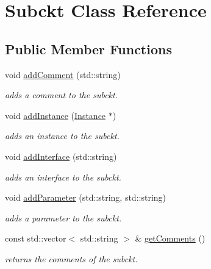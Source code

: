 \hypertarget{class_s_p_i_c_e_1_1_subckt}{}\section{Subckt Class Reference}
\label{class_s_p_i_c_e_1_1_subckt}
\subsection*{Public Member Functions}
\begin{DoxyCompactItemize}
\item 
void \mbox{\hyperlink{class_s_p_i_c_e_1_1_subckt_a6c590c1d92248d6e5f95ea6c470fbb5a}{add\+Comment}} (std\+::string)
\begin{DoxyCompactList}\small\item\em adds a comment to the subckt. \end{DoxyCompactList}\item 
void \mbox{\hyperlink{class_s_p_i_c_e_1_1_subckt_a7bb4a4532643568ab1ac2c229185a88e}{add\+Instance}} (\mbox{\hyperlink{class_s_p_i_c_e_1_1_instance}{Instance}} $\ast$)
\begin{DoxyCompactList}\small\item\em adds an instance to the subckt. \end{DoxyCompactList}\item 
void \mbox{\hyperlink{class_s_p_i_c_e_1_1_subckt_ac162264683fa3d9b3384d3e8cc291fa2}{add\+Interface}} (std\+::string)
\begin{DoxyCompactList}\small\item\em adds an interface to the subckt. \end{DoxyCompactList}\item 
void \mbox{\hyperlink{class_s_p_i_c_e_1_1_subckt_ab3ab147a16bc490ce96db905a4ca271c}{add\+Parameter}} (std\+::string, std\+::string)
\begin{DoxyCompactList}\small\item\em adds a parameter to the subckt. \end{DoxyCompactList}\item 
const std\+::vector$<$ std\+::string $>$ \& \mbox{\hyperlink{class_s_p_i_c_e_1_1_subckt_aa4a73ef909ceb8d442ed2f205967613a}{get\+Comments}} ()
\begin{DoxyCompactList}\small\item\em returns the comments of the subckt. \end{DoxyCompactList}\item 
\mbox{\label{class_s_p_i_c_e_1_1_subckt_a8e6e58ffab876152a740092520c35d73}} 

\end{DoxyCompactItemize}
